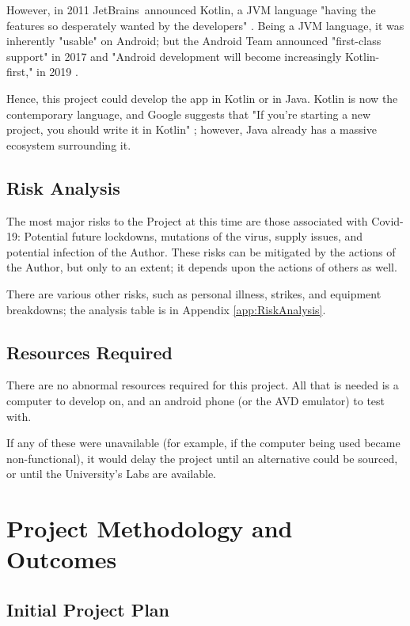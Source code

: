 \documentclass[11pt, a4paper, notitlepage]{report}
\begin{document}
However, in 2011 JetBrains\texttrademark\ announced Kotlin, a JVM language 
"having the features so desperately wanted by the developers" \citep{KotlinAnnounced}. Being a JVM language, it was inherently "usable" on Android; but the Android Team announced "first-class support" in 2017 \citep{KotlinPreferred} and "Android development will become increasingly Kotlin-first," in 2019 \citep{KotlinFirst}.

Hence, this project could develop the app in Kotlin or in Java. Kotlin is now 
the contemporary language, and Google suggests that "If you’re starting a new 
project, you should write it in Kotlin" \citep{KotlinFirst}; however, Java already has a massive ecosystem surrounding it.

\section{Risk Analysis}
The most major risks to the Project at this time are those associated with 
Covid-19: Potential future lockdowns, mutations of the virus, supply issues, 
and potential infection of the Author. These risks can be mitigated by the 
actions of the Author, but only to an extent; it depends upon the actions of 
others as well.

There are various other risks, such as personal illness, strikes, and equipment 
breakdowns; the analysis table is in Appendix \ref{app:RiskAnalysis}.

\section{Resources Required}
There are no abnormal resources required for this project. All that is needed 
is a computer to develop on, and an android phone (or the AVD emulator) to test 
with.

If any of these were unavailable (for example, if the computer being used 
became non-functional), it would delay the project until an alternative could 
be sourced, or until the University's Labs are available.

\chapter{Project Methodology and Outcomes}
\section{Initial Project Plan}
\end{document}
